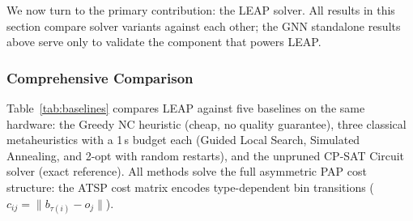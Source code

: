 \documentclass[review,times]{elsarticle}
\begin{document}
We now turn to the primary contribution: the LEAP solver. All results in this section compare solver variants against each other; the GNN standalone results above serve only to validate the component that powers LEAP.

\subsubsection{Comprehensive Comparison}\label{sec:baselines}

Table~\ref{tab:baselines} compares LEAP against five baselines on the same hardware: the Greedy NC heuristic (cheap, no quality guarantee), three classical metaheuristics with a 1\,s budget each (Guided Local Search, Simulated Annealing, and 2-opt with random restarts), and the unpruned CP-SAT Circuit solver (exact reference). All methods solve the full asymmetric PAP cost structure: the ATSP cost matrix encodes type-dependent bin transitions ($c_{ij} = \lVert b_{\tau(i)} - o_j \rVert$).
\end{document}
